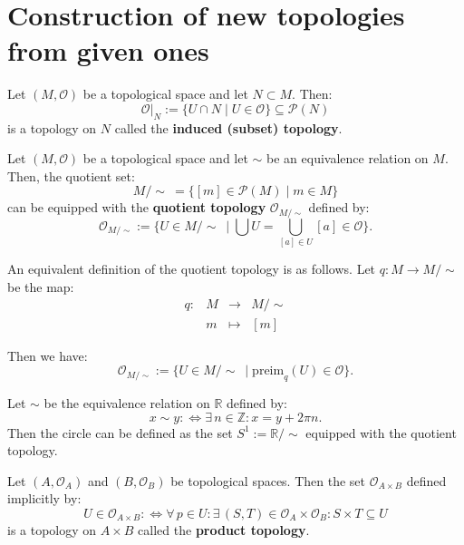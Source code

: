 \documentclass[root.tex]{subfiles}
\begin{document}
\section{Construction of new topologies from given ones}

\begin{mydef}
Let $(M,\mathcal{O})$ be a topological space and let $N\subset M$. Then:
$$
\mathcal{O}|_N := \{U\cap N \mid U \in \mathcal{O}\} \subseteq \mathcal{P}(N)
$$
is a topology on $N$ called the \textbf{induced (subset) topology}.
\end{mydef}

\begin{mydef}
Let $(M,\mathcal{O})$ be a topological space and let $\sim$ be an equivalence relation on $M$. Then, the quotient set:
$$
M/\!\sim \ = \{[m]\in \mathcal{P}(M) \mid m \in M\}
$$
can be equipped with the \textbf{quotient topology} $\mathcal{O}_{M/\sim}$ defined by:
$$
\mathcal{O}_{M/\sim} := \{U \in M/\!\sim \ \mid \bigcup U = \bigcup_{[a]\in U}[a] \in \mathcal{O} \}.
$$
\end{mydef}

An equivalent definition of the quotient topology is as follows. Let $q: M \to M/\!\sim$ be the map:
\begin{equation}
  \begin{aligned}
q : & M & \to & M/\!\sim \\
& m & \mapsto & [m]
  \end{aligned}
\end{equation}

Then we have:
$$
\mathcal{O}_{M/\!\sim} := \{U \in M/\!\sim \ \mid \mathrm{preim}_q(U) \in \mathcal{O} \}.
$$

\begin{myex}
Let $\sim$ be the equivalence relation on $\mathbb{R}$ defined by:
$$
x\sim y :\Leftrightarrow \exists \, n \in \mathbb{Z} : x = y + 2\pi n. 
$$
Then the circle can be defined as the set $S^1:=\mathbb{R}/\!\sim$ equipped with the quotient topology.
\end{myex}


\begin{mydef}
Let $(A,\mathcal{O}_A)$ and $(B,\mathcal{O}_B)$ be topological spaces. Then the set $\mathcal{O}_{A\times B}$ defined implicitly by:
$$
U \in \mathcal{O}_{A\times B} :\Leftrightarrow \forall \, p \in U : \exists \, (S,T) \in \mathcal{O}_A\times \mathcal{O}_B : S\times T \subseteq U
$$
is a topology on $A\times B$ called the \textbf{product topology}.
\end{mydef}
\end{document}
